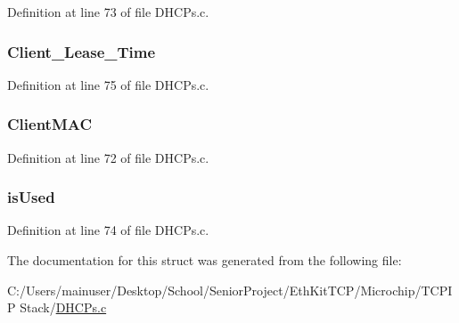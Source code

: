 Definition at line 73 of file D\+H\+C\+Ps.\+c.

\hypertarget{struct_d_h_c_p___i_p___p_o_o_l_aac2996e6608bc831a1c087a5ca414695}{}
\subsubsection[{Client\+\_\+\+Lease\+\_\+\+Time}]{ Client\+\_\+\+Lease\+\_\+\+Time}\label{struct_d_h_c_p___i_p___p_o_o_l_aac2996e6608bc831a1c087a5ca414695}


Definition at line 75 of file D\+H\+C\+Ps.\+c.

\hypertarget{struct_d_h_c_p___i_p___p_o_o_l_a1a848c890fc2e770e93568912cf5de1f}{}
\subsubsection[{Client\+M\+A\+C}]{ Client\+M\+A\+C}\label{struct_d_h_c_p___i_p___p_o_o_l_a1a848c890fc2e770e93568912cf5de1f}


Definition at line 72 of file D\+H\+C\+Ps.\+c.

\hypertarget{struct_d_h_c_p___i_p___p_o_o_l_a77e19c8d1c90a2f35d90335fbf5a2c5e}{}
\subsubsection[{is\+Used}]{ is\+Used}\label{struct_d_h_c_p___i_p___p_o_o_l_a77e19c8d1c90a2f35d90335fbf5a2c5e}


Definition at line 74 of file D\+H\+C\+Ps.\+c.



The documentation for this struct was generated from the following file\+:\begin{DoxyCompactItemize}
\item 
C\+:/\+Users/mainuser/\+Desktop/\+School/\+Senior\+Project/\+Eth\+Kit\+T\+C\+P/\+Microchip/\+T\+C\+P\+I\+P Stack/\hyperlink{_d_h_c_ps_8c}{D\+H\+C\+Ps.\+c}\end{DoxyCompactItemize}
